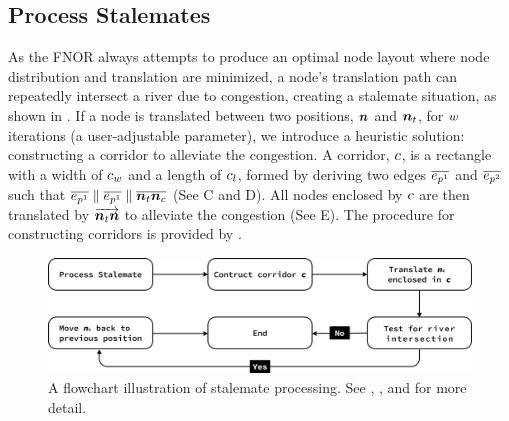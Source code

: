 \subsection{Process Stalemates}

As the FNOR always attempts to produce an optimal node layout where node distribution and translation are minimized, a node's translation path can repeatedly intersect a river due to congestion, creating a stalemate situation, as shown in . If a node is translated between two positions, $ \bm{n} $ and $ \bm{n}_t $, for $ w $ iterations (a user-adjustable parameter), we introduce a heuristic solution: constructing a corridor to alleviate the congestion. A corridor, $ c $, is a rectangle with a width of $ c_w $ and a length of $ c_l $, formed by deriving two edges $ \protect\overline{e_{p^1}} $ and $ \protect\overline{e_{p^2}} $ such that $ \protect\overline{e_{p^1}} \parallel \protect\overline{e_{p^1}} \parallel \protect\overline{\bm{n}_t\bm{n}_c} $ (See C and D). All nodes enclosed by $ c $ are then translated by $ \protect\overrightarrow{\bm{n}_t\bm{n}} $ to alleviate the congestion (See E). The procedure for constructing corridors is provided by .

{
    \begin{figure}[tb!]
        \centering
        \includegraphics[width=\columnwidth,keepaspectratio]{figure/flowchart stalemate.png}
        \caption{A flowchart illustration of stalemate processing. See , , and  for more detail.}
        \label{fig:flowchart-stalemate}
    \end{figure}
   }
   
